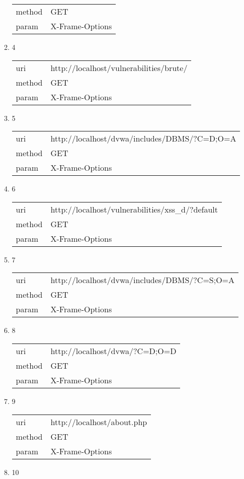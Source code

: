 \documentclass[10pt]{article}
\begin{document}
\begin{itemize}
\begin{enumerate}
\begin{tabular}{| l | p{14cm}}
method & GET \\
param & X-Frame-Options \\
\end{tabular}
\item[] 4
\begin{tabular}{| l | p{14cm}}
uri & http://localhost/vulnerabilities/brute/ \\
method & GET \\
param & X-Frame-Options \\
\end{tabular}
\item[] 5
\begin{tabular}{| l | p{14cm}}
uri & http://localhost/dvwa/includes/DBMS/?C=D;O=A \\
method & GET \\
param & X-Frame-Options \\
\end{tabular}
\item[] 6
\begin{tabular}{| l | p{14cm}}
uri & http://localhost/vulnerabilities/xss{\_}d/?default \\
method & GET \\
param & X-Frame-Options \\
\end{tabular}
\item[] 7
\begin{tabular}{| l | p{14cm}}
uri & http://localhost/dvwa/includes/DBMS/?C=S;O=A \\
method & GET \\
param & X-Frame-Options \\
\end{tabular}
\item[] 8
\begin{tabular}{| l | p{14cm}}
uri & http://localhost/dvwa/?C=D;O=D \\
method & GET \\
param & X-Frame-Options \\
\end{tabular}
\item[] 9
\begin{tabular}{| l | p{14cm}}
uri & http://localhost/about.php \\
method & GET \\
param & X-Frame-Options \\
\end{tabular}
\item[] 10
\begin{tabular}{| l | p{14cm}}

\end{tabular}
\end{enumerate}
\end{itemize}
\end{document}
